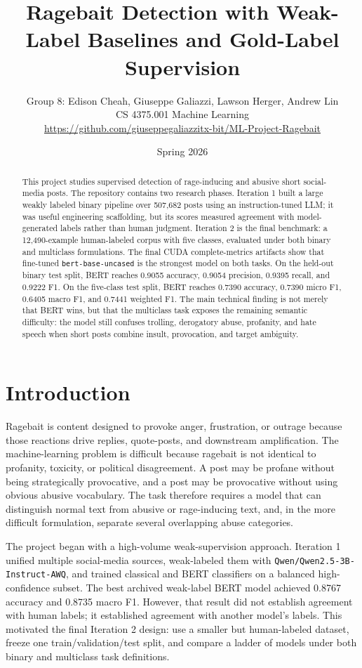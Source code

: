 \documentclass[11pt]{article}
\title{\textbf{Ragebait Detection with Weak-Label Baselines and Gold-Label Supervision}}
\author{Group 8: Edison Cheah, Giuseppe Galiazzi, Lawson Herger, Andrew Lin\\
CS 4375.001 Machine Learning\\
\url{https://github.com/giuseppegaliazzitx-bit/ML-Project-Ragebait}}
\date{Spring 2026}
\begin{document}
\maketitle

\begin{abstract}
This project studies supervised detection of rage-inducing and abusive short social-media posts. The repository contains two research phases. Iteration 1 built a large weakly labeled binary pipeline over 507,682 posts using an instruction-tuned LLM; it was useful engineering scaffolding, but its scores measured agreement with model-generated labels rather than human judgment. Iteration 2 is the final benchmark: a 12,490-example human-labeled corpus with five classes, evaluated under both binary and multiclass formulations. The final CUDA complete-metrics artifacts show that fine-tuned \texttt{bert-base-uncased} is the strongest model on both tasks. On the held-out binary test split, BERT reaches 0.9055 accuracy, 0.9054 precision, 0.9395 recall, and 0.9222 F1. On the five-class test split, BERT reaches 0.7390 accuracy, 0.7390 micro F1, 0.6405 macro F1, and 0.7441 weighted F1. The main technical finding is not merely that BERT wins, but that the multiclass task exposes the remaining semantic difficulty: the model still confuses trolling, derogatory abuse, profanity, and hate speech when short posts combine insult, provocation, and target ambiguity.
\end{abstract}

\section{Introduction}

Ragebait is content designed to provoke anger, frustration, or outrage because those reactions drive replies, quote-posts, and downstream amplification. The machine-learning problem is difficult because ragebait is not identical to profanity, toxicity, or political disagreement. A post may be profane without being strategically provocative, and a post may be provocative without using obvious abusive vocabulary. The task therefore requires a model that can distinguish normal text from abusive or rage-inducing text, and, in the more difficult formulation, separate several overlapping abuse categories.

The project began with a high-volume weak-supervision approach. Iteration 1 unified multiple social-media sources, weak-labeled them with \texttt{Qwen/Qwen2.5-3B-Instruct-AWQ}, and trained classical and BERT classifiers on a balanced high-confidence subset. The best archived weak-label BERT model achieved 0.8767 accuracy and 0.8735 macro F1. However, that result did not establish agreement with human labels; it established agreement with another model's labels. This motivated the final Iteration 2 design: use a smaller but human-labeled dataset, freeze one train/validation/test split, and compare a ladder of models under both binary and multiclass task definitions.
\end{document}
